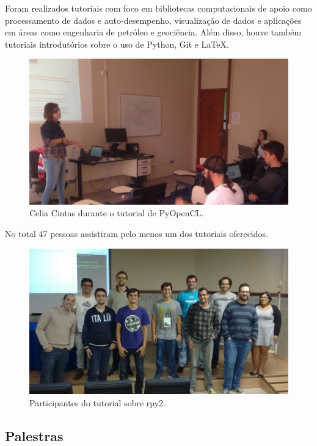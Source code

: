 \documentclass[12pt]{article}
\begin{document}
Foram realizados tutoriais com foco em bibliotecas computacionais de apoio como processamento de dados e auto-desempenho, visualização de dados e aplicações em áreas como engenharia de petróleo e geociência. Além disso, houve também tutoriais introdutórios sobre o uso de Python, Git e LaTeX.

\begin{figure}[!htb]
\center
\includegraphics[height=.3\textheight]{tutorial-pyopencl.jpg}
\caption{Celia Cintas durante o tutorial de PyOpenCL.}
\end{figure}

No total 47 pessoas assistiram pelo menos um dos tutoriais oferecidos.

\begin{figure}[!htb]
\center
\includegraphics[height=.3\textheight]{tutorial-rpy.jpg}
\caption{Participantes do tutorial sobre rpy2.}
\end{figure}

\subsection*{Palestras}
\end{document}
